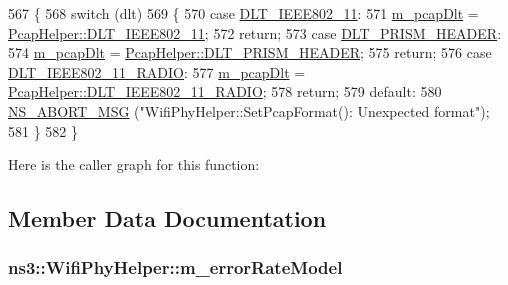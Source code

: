 \begin{DoxyCode}
567 \{
568   \textcolor{keywordflow}{switch} (dlt)
569     \{
570     \textcolor{keywordflow}{case} \hyperlink{classns3_1_1WifiPhyHelper_ab5b7fd179ec894742ac15f6751d68fc1ab287870c1a08318981eb4a2e8f20b9f1}{DLT\_IEEE802\_11}:
571       \hyperlink{classns3_1_1WifiPhyHelper_a5d28515f3c747bf279568538546bb2a2}{m\_pcapDlt} = \hyperlink{classns3_1_1PcapHelper_a2ee4dad28ddd9a1fe636f51835eaa77fa6999575ac98d2d1345c7706b9be0e192}{PcapHelper::DLT\_IEEE802\_11};
572       \textcolor{keywordflow}{return};
573     \textcolor{keywordflow}{case} \hyperlink{classns3_1_1WifiPhyHelper_ab5b7fd179ec894742ac15f6751d68fc1af1f8109d212120172df5cbce29305a0a}{DLT\_PRISM\_HEADER}:
574       \hyperlink{classns3_1_1WifiPhyHelper_a5d28515f3c747bf279568538546bb2a2}{m\_pcapDlt} = \hyperlink{classns3_1_1PcapHelper_a2ee4dad28ddd9a1fe636f51835eaa77faf990acee7d35df750cc18af5bf29e9d7}{PcapHelper::DLT\_PRISM\_HEADER};
575       \textcolor{keywordflow}{return};
576     \textcolor{keywordflow}{case} \hyperlink{classns3_1_1WifiPhyHelper_ab5b7fd179ec894742ac15f6751d68fc1aefaad41088dc2cef3ecd98bcb3dd2653}{DLT\_IEEE802\_11\_RADIO}:
577       \hyperlink{classns3_1_1WifiPhyHelper_a5d28515f3c747bf279568538546bb2a2}{m\_pcapDlt} = \hyperlink{classns3_1_1PcapHelper_a2ee4dad28ddd9a1fe636f51835eaa77fa186fad03d814f2abed0d6309fa9adc3f}{PcapHelper::DLT\_IEEE802\_11\_RADIO};
578       \textcolor{keywordflow}{return};
579     \textcolor{keywordflow}{default}:
580       \hyperlink{group__fatal_ga51ac4699be799d772ae7258d1ef6af21}{NS\_ABORT\_MSG} (\textcolor{stringliteral}{"WifiPhyHelper::SetPcapFormat(): Unexpected format"});
581     \}
582 \}
\end{DoxyCode}


Here is the caller graph for this function\+:




\subsection{Member Data Documentation}
\subsubsection[{\texorpdfstring{m\+\_\+error\+Rate\+Model}{m_errorRateModel}}]{ ns3\+::\+Wifi\+Phy\+Helper\+::m\+\_\+error\+Rate\+Model\hspace{0.3cm}{\ttfamily [protected]}}\hypertarget{classns3_1_1WifiPhyHelper_a7c698249ec8cee27e1ad1f175ce300fd}{}\label{classns3_1_1WifiPhyHelper_a7c698249ec8cee27e1ad1f175ce300fd}


